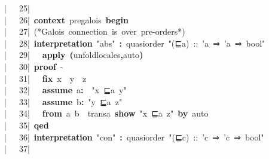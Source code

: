 \documentclass{article}
\newcommand{\syntaxCOMMENTA}[1]{\textcolor[rgb]{0.8,0.0,0.0}{#1}}
\newcommand{\syntaxKEYWORDA}[1]{\textcolor[rgb]{0.0,0.4,0.6}{\textbf{#1}}}
\newcommand{\syntaxKEYWORDB}[1]{\textcolor[rgb]{0.0,0.6,0.4}{\textbf{#1}}}
\newcommand{\syntaxKEYWORDC}[1]{\textcolor[rgb]{0.0,0.6,1.0}{\textbf{#1}}}
\newcommand{\syntaxLITERALA}[1]{\textcolor[rgb]{1.0,0.0,0.8}{#1}}
\newcommand{\syntaxOPERATOR}[1]{\textcolor[rgb]{0.0,0.0,0.0}{\textbf{#1}}}
\newcommand{\syntaxCOMMENTA}[1]{\textcolor[rgb]{0.8,0.0,0.0}{#1}}
\newcommand{\syntaxKEYWORDA}[1]{\textcolor[rgb]{0.0,0.4,0.6}{\textbf{#1}}}
\newcommand{\syntaxKEYWORDB}[1]{\textcolor[rgb]{0.0,0.6,0.4}{\textbf{#1}}}
\newcommand{\syntaxKEYWORDC}[1]{\textcolor[rgb]{0.0,0.6,1.0}{\textbf{#1}}}
\newcommand{\syntaxLITERALA}[1]{\textcolor[rgb]{1.0,0.0,0.8}{#1}}
\newcommand{\syntaxOPERATOR}[1]{\textcolor[rgb]{0.0,0.0,0.0}{\textbf{#1}}}
\newcommand{\syntaxCOMMENTA}[1]{\textcolor[rgb]{0.8,0.0,0.0}{#1}}
\newcommand{\syntaxKEYWORDA}[1]{\textcolor[rgb]{0.0,0.4,0.6}{\textbf{#1}}}
\newcommand{\syntaxKEYWORDB}[1]{\textcolor[rgb]{0.0,0.6,0.4}{\textbf{#1}}}
\newcommand{\syntaxKEYWORDC}[1]{\textcolor[rgb]{0.0,0.6,1.0}{\textbf{#1}}}
\newcommand{\syntaxLITERALA}[1]{\textcolor[rgb]{1.0,0.0,0.8}{#1}}
\newcommand{\syntaxOPERATOR}[1]{\textcolor[rgb]{0.0,0.0,0.0}{\textbf{#1}}}
\newcommand{\syntaxCOMMENTA}[1]{\textcolor[rgb]{0.8,0.0,0.0}{\textbf{#1}}}
\newcommand{\syntaxKEYWORDA}[1]{\textcolor[rgb]{0.0,0.4,0.6}{#1}}
\newcommand{\syntaxKEYWORDB}[1]{\textcolor[rgb]{0.0,0.6,0.4}{#1}}
\newcommand{\syntaxKEYWORDC}[1]{\textcolor[rgb]{0.0,0.6,1.0}{#1}}
\newcommand{\syntaxLITERALA}[1]{\textcolor[rgb]{1.0,0.0,0.8}{\textbf{#1}}}
\newcommand{\syntaxOPERATOR}[1]{\textcolor[rgb]{0.0,0.0,0.0}{#1}}
\newcommand{\syntaxCOMMENTA}[1]{\textcolor[rgb]{0.8,0.0,0.0}{#1}}
\newcommand{\syntaxKEYWORDA}[1]{\textcolor[rgb]{0.0,0.4,0.6}{\textbf{#1}}}
\newcommand{\syntaxKEYWORDB}[1]{\textcolor[rgb]{0.0,0.6,0.4}{\textbf{#1}}}
\newcommand{\syntaxKEYWORDC}[1]{\textcolor[rgb]{0.0,0.6,1.0}{\textbf{#1}}}
\newcommand{\syntaxLITERALA}[1]{\textcolor[rgb]{1.0,0.0,0.8}{#1}}
\newcommand{\syntaxOPERATOR}[1]{\textcolor[rgb]{0.0,0.0,0.0}{\textbf{#1}}}
\newcommand{\syntaxCOMMENTA}[1]{\textcolor[rgb]{0.8,0.0,0.0}{#1}}
\newcommand{\syntaxKEYWORDA}[1]{\textcolor[rgb]{0.0,0.4,0.6}{\textbf{#1}}}
\newcommand{\syntaxKEYWORDB}[1]{\textcolor[rgb]{0.0,0.6,0.4}{\textbf{#1}}}
\newcommand{\syntaxKEYWORDC}[1]{\textcolor[rgb]{0.0,0.6,1.0}{\textbf{#1}}}
\newcommand{\syntaxLITERALA}[1]{\textcolor[rgb]{1.0,0.0,0.8}{#1}}
\newcommand{\syntaxOPERATOR}[1]{\textcolor[rgb]{0.0,0.0,0.0}{\textbf{#1}}}
\newcommand{\syntaxCOMMENTA}[1]{\textcolor[rgb]{0.0,0.0,0.0}{#1}}
\newcommand{\syntaxKEYWORDA}[1]{\textcolor[rgb]{0.0,0.0,0.0}{#1}}
\newcommand{\syntaxKEYWORDB}[1]{\textcolor[rgb]{0.0,0.0,0.0}{#1}}
\newcommand{\syntaxKEYWORDC}[1]{\textcolor[rgb]{0.0,0.0,0.0}{#1}}
\newcommand{\gutter}[1]{\textcolor[rgb]{0,0,0}{{|}#1}}
\newcommand{\gutterH}[1]{\textcolor[rgb]{1,0,0}{{|}#1}}
\begin{document}
\gutterH{\ \ \ 25{|}\ }\hspace*{\fill}\\
\gutter{\ \ \ 26{|}\ }\syntaxKEYWORDA{context}{\ }pre\usebox{\underscorebox}galois{\ }\syntaxKEYWORDB{begin}\hspace*{\fill}\\
\gutter{\ \ \ 27{|}\ }\syntaxCOMMENTA{(*Galois{\ }connection{\ }is{\ }over{\ }pre{-}orders*)}\hspace*{\fill}\\
\gutter{\ \ \ 28{|}\ }\syntaxKEYWORDA{interpretation}{\ }\syntaxLITERALA{"abs"}{\ }\syntaxOPERATOR{:}{\ }quasi\usebox{\underscorebox}order{\ }\syntaxLITERALA{"(⊑a){\ }::{\ }'a{\ }⇒{\ }'a{\ }⇒{\ }bool"}\hspace*{\fill}\\
\gutter{\ \ \ 29{|}\ }{\ }{\ }\syntaxKEYWORDA{apply}{\ }\syntaxOPERATOR{(}unfold\usebox{\underscorebox}locales\syntaxOPERATOR{,}auto\syntaxOPERATOR{)}{\ }{\ }{\ }{\ }\hspace*{\fill}\\
\gutterH{\ \ \ 30{|}\ }\syntaxKEYWORDA{proof}{\ }{-}\hspace*{\fill}\\
\gutter{\ \ \ 31{|}\ }{\ }{\ }\syntaxKEYWORDC{fix}{\ }x{\ }{\ }y{\ }{\ }z{\ }{\ }\hspace*{\fill}\\
\gutter{\ \ \ 32{|}\ }{\ }{\ }\syntaxKEYWORDC{assume}{\ }a\syntaxOPERATOR{:}{\ }{\ }\syntaxLITERALA{"x{\ }⊑a{\ }y"}\hspace*{\fill}\\
\gutter{\ \ \ 33{|}\ }{\ }{\ }\syntaxKEYWORDC{assume}{\ }b\syntaxOPERATOR{:}{\ }\syntaxLITERALA{"y{\ }⊑a{\ }z"}\hspace*{\fill}\\
\gutter{\ \ \ 34{|}\ }{\ }{\ }\syntaxKEYWORDA{from}{\ }a{\ }b{\ }{\ }transa{\ }\syntaxKEYWORDC{show}{\ }\syntaxLITERALA{"x{\ }⊑a{\ }z"}{\ }\syntaxKEYWORDA{by}{\ }auto{\ }\hspace*{\fill}\\
\gutterH{\ \ \ 35{|}\ }\syntaxKEYWORDA{qed}{\ }\hspace*{\fill}\\
\gutter{\ \ \ 36{|}\ }\syntaxKEYWORDA{interpretation}{\ }\syntaxLITERALA{"con"}{\ }\syntaxOPERATOR{:}{\ }quasi\usebox{\underscorebox}order{\ }\syntaxLITERALA{"(⊑c){\ }::{\ }'c{\ }⇒{\ }'c{\ }⇒{\ }bool"}\hspace*{\fill}\\
\gutter{\ \ \ 37{|}\ }\hspace*{\fill}\\
\end{document}

